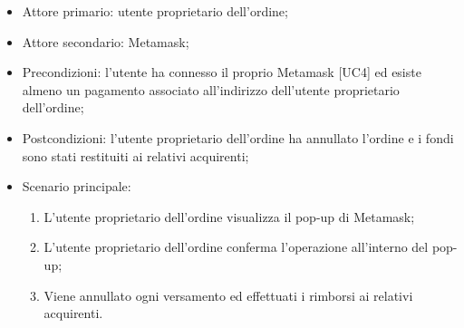 \begin{itemize}
    \item Attore primario: utente proprietario dell'ordine;
    \item Attore secondario: Metamask\glo{};
    \item Precondizioni: l'utente ha connesso il proprio Metamask\glo{} [UC4] ed esiste almeno un pagamento associato all'indirizzo dell'utente proprietario dell'ordine;
    \item Postcondizioni: l'utente proprietario dell'ordine ha annullato l'ordine e i fondi sono stati restituiti ai relativi acquirenti;
    \item Scenario principale:
          \begin{enumerate}
              \item L'utente proprietario dell'ordine visualizza il pop-up di Metamask\glo{};
              \item L'utente proprietario dell'ordine conferma l'operazione all'interno del pop-up;
              \item Viene annullato ogni versamento ed effettuati i rimborsi ai relativi acquirenti.
          \end{enumerate}
\end{itemize}

\clearpage
